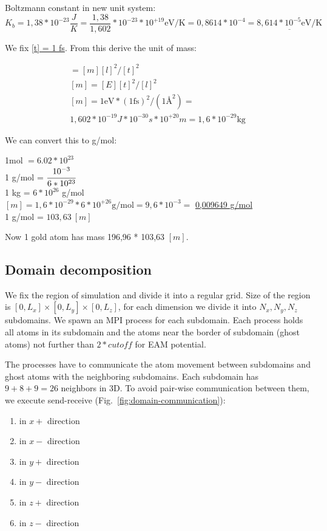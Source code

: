 \documentclass[12pt,a4paper]{article}
\begin{document}
Boltzmann constant in new unit system: \[ K_b = 1,38 * 10^{-23} \frac{J}{K} = \frac{1,38}{1,602} * 10^{-23} * 10^{+19} \text{eV/K} = 0,8614 * 10^{-4} = \underline{8,614 * 10^{-5} \text{eV/K}} \]

We fix \underline{[t] = 1 fs}. From this derive the unit of mass: 

\begin{gather*}
	[E] = [m][l]^2/[t]^2\\
	[m] = [E][t]^2/[l]^2\\
	[m] = 1 \text{eV} * (1 \text{fs})^2 / (1 \text{Å}^2) =\\
	1,602 * 10^{-19} J * 10^{-30} s * 10^{+20} m = 1,6 * 10^{-29} \text{kg}
\end{gather*}

We can convert this to g/mol:
\begin{center}
	1mol $= 6.02 * 10^{23}$\\
	1 g/mol = $\cfrac{10^{-3}}{6 * 10^{23}} $\\
	1 kg = $6 * 10^{26}$ g/mol\\
	$[m] = 1,6 * 10^{-29} * 6 * 10^{+26} \text{g/mol} = 9,6 * 10^{-3} =$ \underline{0,009649 g/mol}\\
	1 g/mol = $103,63\ [m]$
\end{center}

Now 1 gold atom has mass 196,96 * 103,63 $[m]$.

\subsection*{Domain decomposition}

We fix the region of simulation and divide it into a regular grid. Size of the region is $[0, L_x] \times [0, L_y] \times [0, L_z]$, for each dimension we divide it into $N_x, N_y, N_z$ subdomains. We spawn an MPI process for each subdomain. Each process holds all atoms in its subdomain and the atoms near the border of subdomain (ghost atoms) not further than $2 * cutoff$ for EAM potential.

The processes have to communicate the atom movement between subdomains and ghost atoms with the neighboring subdomains. Each subdomain has $9+8+9=26$ neighbors in 3D. To avoid pair-wise communication between them, we execute send-receive (Fig.~\ref{fig:domain-communication}):

\begin{enumerate}
	\item in $x+$ direction
	\item in $x-$ direction
	\item in $y+$ direction
	\item in $y-$ direction
	\item in $z+$ direction
	\item in $z-$ direction
\end{enumerate}
\end{document}
